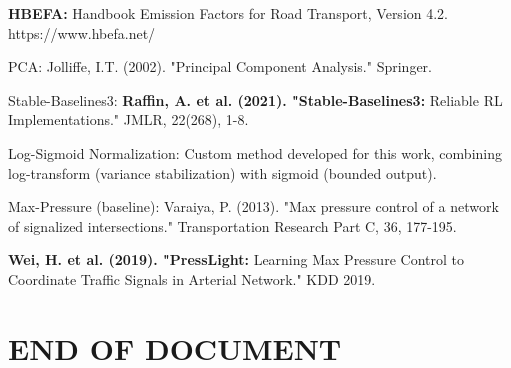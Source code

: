 \documentclass[11pt,a4paper]{article}
\begin{document}
\textbf{HBEFA:}
Handbook Emission Factors for Road Transport, Version 4.2.
https://www.hbefa.net/

PCA:
Jolliffe, I.T. (2002). "Principal Component Analysis." Springer.

Stable-Baselines3:
\textbf{Raffin, A. et al. (2021). "Stable-Baselines3:} Reliable RL Implementations."
JMLR, 22(268), 1-8.

Log-Sigmoid Normalization:
Custom method developed for this work, combining log-transform
(variance stabilization) with sigmoid (bounded output).

Max-Pressure (baseline):
Varaiya, P. (2013). "Max pressure control of a network of signalized
intersections." Transportation Research Part C, 36, 177-195.

\textbf{Wei, H. et al. (2019). "PressLight:} Learning Max Pressure Control to
Coordinate Traffic Signals in Arterial Network." KDD 2019.


\section*{END OF DOCUMENT}
\end{document}
